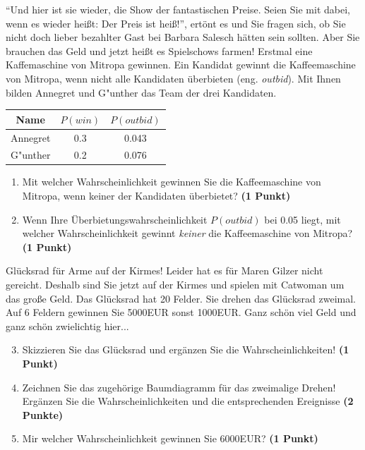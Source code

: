 \documentclass[a4paper, 9pt]{scrartcl}\usepackage[]{graphicx}\usepackage[]{xcolor}
\begin{document}
"`Und hier ist sie wieder, die Show der fantastischen Preise. Seien Sie mit
dabei, wenn es wieder hei{\ss}t: Der Preis ist hei{\ss}!"', ert{\"o}nt es und Sie
fragen sich, ob Sie nicht doch lieber bezahlter Gast bei Barbara Salesch
h{\"a}tten sein sollten. Aber Sie brauchen das Geld und jetzt hei{\ss}t es
Spielschows farmen! Erstmal eine Kaffemaschine von Mitropa
gewinnen. Ein Kandidat gewinnt die Kaffeemaschine von Mitropa, wenn nicht alle
Kandidaten {\"u}berbieten (eng. \textit{outbid}). Mit Ihnen bilden
Annegret und G{"u}nther das Team der drei Kandidaten.

\begin{center}
\begin{tabular}{ccc}
  \toprule
  Name & $P(win)$ & $P(outbid)$\\
  \midrule
  Annegret & 0.3 & 0.043\\
  G{"u}nther & 0.2 & 0.076 \\
  \bottomrule
\end{tabular}
\end{center}

\begin{enumerate}
\item Mit welcher Wahrscheinlichkeit gewinnen Sie die Kaffeemaschine von
  Mitropa, wenn keiner der Kandidaten {\"u}berbietet? \textbf{(1 Punkt)}
\item Wenn Ihre {\"U}berbietungswahrscheinlichkeit $P(outbid)$ bei
  0.05 liegt, mit welcher Wahrscheinlichkeit gewinnt
  \textit{keiner} die Kaffeemaschine von Mitropa? \textbf{(1 Punkt)}
\end{enumerate}

Gl{\"u}cksrad f{\"u}r Arme auf der Kirmes! Leider hat es f{\"u}r Maren Gilzer nicht
gereicht. Deshalb sind Sie jetzt auf der Kirmes und spielen mit
Catwoman um das gro{\ss}e Geld. Das Gl{\"u}cksrad hat 20
Felder. Sie drehen das Gl{\"u}cksrad zweimal. Auf 6 Feldern
gewinnen Sie 5000EUR sonst 1000EUR. Ganz sch{\"o}n viel Geld
und ganz sch{\"o}n zwielichtig hier...

\begin{enumerate}
  \setcounter{enumi}{2}  
\item Skizzieren Sie das Gl{\"u}cksrad und erg{\"a}nzen Sie die
  Wahrscheinlichkeiten! \textbf{(1 Punkt)}
\item Zeichnen Sie das zugeh{\"o}rige Baumdiagramm f{\"u}r das zweimalige Drehen!
  Erg{\"a}nzen Sie die Wahrscheinlichkeiten und die entsprechenden Ereignisse
  \textbf{(2 Punkte)}
\item Mir welcher Wahrscheinlichkeit gewinnen Sie 6000EUR? \textbf{(1
    Punkt)}
\end{enumerate}
\end{document}
